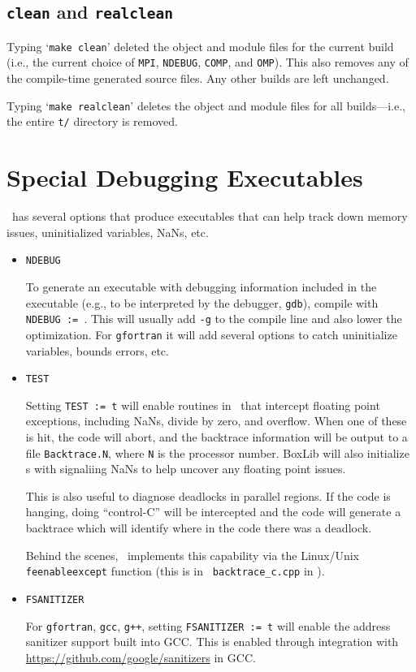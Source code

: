 \subsection{{\tt clean} and {\tt realclean}}

Typing `{\tt make clean}' deleted the object and module files for the
current build (i.e., the current choice of {\tt MPI}, {\tt NDEBUG},
{\tt COMP}, and {\tt OMP}).  This also removes any of the compile-time
generated source files.  Any other builds are left unchanged.

Typing `{\tt make realclean}' deletes the object and module files for
all builds---i.e., the entire {\tt t/} directory is removed.


\section{Special Debugging Executables}

\boxlib\ has several options that produce executables that can help
track down memory issues, uninitialized variables, NaNs, etc.

\begin{itemize}

\item {\tt NDEBUG} 

   To generate an executable
  with debugging information included in the executable (e.g., to be
  interpreted by the debugger, {\tt gdb}), compile with {\tt NDEBUG
    :=\ }.  This will usually add {\tt -g} to the compile line and
  also lower the optimization.  For {\tt gfortran} it will add several
  options to catch uninitialize variables, bounds errors, etc.


\item {\tt TEST}

  Setting {\tt TEST := t} will
  enable routines in \boxlib\ that intercept floating point
  exceptions, including NaNs, divide by zero, and overflow.  When one
  of these is hit, the code will abort, and the backtrace information
  will be output to a file {\tt Backtrace.N}, where {\tt N} is the
  processor number.  BoxLib will also initialize \multifab s with
  signaliing NaNs to help uncover any floating point issues.

  This is also useful to diagnose deadlocks in parallel regions.
  If the code is hanging, doing ``control-C'' will be intercepted
  and the code will generate a backtrace which will identify
  where in the code there was a deadlock.

  Behind the scenes, \boxlib\ implements this capability via the
  Linux/Unix {\tt feenableexcept} function (this is in {\tt
    backtrace\_c.cpp} in \boxlib).

\item {\tt FSANITIZER}

  For {\tt gfortran}, {\tt gcc}, {\tt g++}, setting {\tt FSANITIZER :=
    t} will enable the
  address sanitizer support built into GCC.  This is enabled through
  integration with \url{https://github.com/google/sanitizers} in GCC.

\end{itemize}


